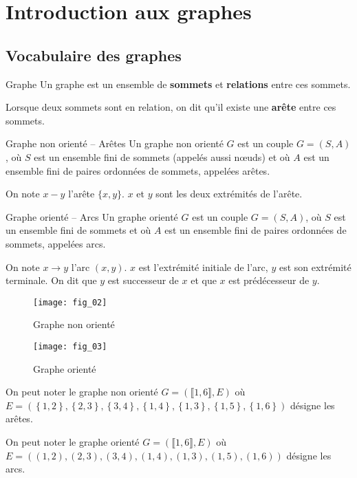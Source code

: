 \section{Introduction aux graphes}

\subsection{Vocabulaire des graphes}

\begin{defi}{Graphe}%
Un graphe est un ensemble de \textbf{sommets} et  \textbf{relations} entre ces sommets.

Lorsque deux sommets sont en relation, on dit qu'il existe une \textbf{arête} entre ces sommets.
\end{defi}

\begin{defi}{Graphe non orienté -- Arêtes}
Un graphe non orienté $G$ est un couple $G=(S,A)$, où $S$ est un ensemble fini de sommets (appelés aussi n\oe uds)  et où $A$ est un ensemble fini de paires ordonnées de sommets, appelées arêtes.

On note $x - y$ l'arête $\{x,y\}$. $x$ et $y$ sont les deux extrémités de l'arête.
\end{defi}

\begin{defi}{Graphe orienté -- Arcs}\cite{ref_01}
Un graphe orienté $G$ est un couple $G=(S,A)$, où $S$ est un ensemble fini de sommets et où $A$ est un ensemble fini de paires ordonnées de sommets, appelées arcs.

On note $x\to y$ l'arc $(x,y)$. $x$ est l'extrémité initiale de l'arc, $y$ est son extrémité terminale. On dit que $y$ est successeur de $x$ et que $x$ est prédécesseur de $y$. 
\end{defi}

\begin{multicols}{2}
\begin{figure}[H]
\texttt{[image: fig\_02]}
\captionsetup{justification=centering}
\caption{Graphe non orienté \label{fig_02}}
\end{figure}

\begin{figure}[H]
\texttt{[image: fig\_03]}
\captionsetup{justification=centering}
\caption{Graphe orienté}
\end{figure}
\end{multicols}

\begin{rem}
On peut noter le graphe non orienté $G=\left(\llbracket 1,6\rrbracket,E\right)$ où $E=\left(
\left\{1,2\right\},\left\{2,3\right\},\left\{3,4\right\},\left\{1,4\right\},\left\{1,3\right\},\left\{1,5\right\},\left\{1,6\right\}\right)$ désigne les arêtes. 

On peut noter le graphe orienté $G=\left(\llbracket 1,6\rrbracket,E\right)$ où $E=\left(
\left(1,2\right),\left(2,3\right),\left(3,4\right),\left(1,4\right),\left(1,3\right),\left(1,5\right),\left(1,6\right)\right)$ désigne les arcs. 
\end{rem}

